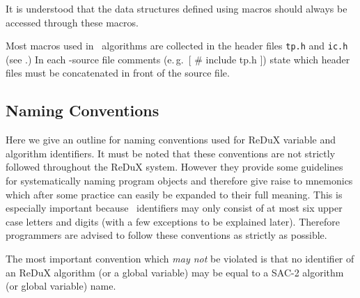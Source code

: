 It is understood that the data structures defined using macros should always
be accessed through these macros.

Most macros used in \redux\ algorithms are collected in the header files
{\tt tp.h} and {\tt ic.h} (see \RIX.)
In each \redux-source file  comments (e.\,g.\  $[$ \# include tp.h $]$)
state which header files must be concatenated in front of the source file.

\subsection{Naming Conventions}

Here we give an outline for naming conventions used for ReDuX variable and
algorithm identifiers.
It must be noted that these conventions are not strictly followed
throughout the ReDuX system.
However they provide some guidelines for systematically naming program objects
and therefore give raise to mnemonics which after some practice can 
easily be expanded to their full meaning.
This is especially important because \ALDES\ identifiers may only consist of
at most six upper case letters and digits (with a few exceptions to be
explained later).
Therefore programmers are advised to follow these conventions as strictly as
possible.

The most important convention which {\em may not} be violated is that 
no identifier of an ReDuX algorithm (or a global variable) may be equal to a 
SAC-2 algorithm (or global variable) name.


